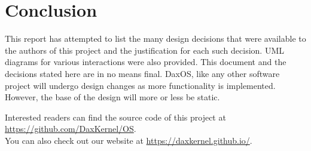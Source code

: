 
\chapter{Conclusion}\label{chapter:Conclusion}
\begin{flushleft}
	This report has attempted to list the many design decisions that were available to the authors of this project and the justification for each such
	decision. UML diagrams for various interactions were also provided. This document and the decisions stated here are in no means final. DaxOS, like
	any other software project will undergo design changes as more functionality is implemented. However, the base of the design will more or less be static.

	\vspace{1.5 cm}

	Interested readers can find the source code of this project at \url{https://github.com/DaxKernel/OS}.\\
	You can also check out our website at \url{https://daxkernel.github.io/}.
\end{flushleft}
